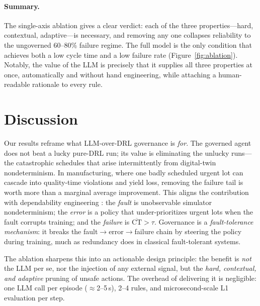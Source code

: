 \documentclass[letterpaper]{article} %
\begin{document}
\paragraph{Summary.}
The single-axis ablation gives a clear verdict: each of the three
properties---hard, contextual, adaptive---is necessary, and removing any one
collapses reliability to the ungoverned 60--80\% failure regime. The full model
is the only condition that achieves both a low cycle time and a low failure rate
(Figure~\ref{fig:ablation}). Notably, the value of the LLM is precisely that it
supplies all three properties at once, automatically and without hand
engineering, while attaching a human-readable rationale to every rule.

\section{Discussion}
\label{sec:discussion}

Our results reframe what LLM-over-DRL governance is \emph{for}. The governed
agent does not beat a lucky pure-DRL run; its value is eliminating the unlucky
runs---the catastrophic schedules that arise intermittently from digital-twin
nondeterminism. In manufacturing, where one badly scheduled urgent lot can
cascade into quality-time violations and yield loss, removing the failure tail is
worth more than a marginal average improvement. This aligns the contribution with
dependability engineering \citep{avizienis2004}: the \emph{fault} is
unobservable simulator nondeterminism; the \emph{error} is a policy that
under-prioritizes urgent lots when the fault corrupts training; and the
\emph{failure} is $\overline{\mathrm{CT}}>\tau$. Governance is a
\emph{fault-tolerance mechanism}: it breaks the fault$\to$error$\to$failure chain
by steering the policy during training, much as redundancy does in classical
fault-tolerant systems.

The ablation sharpens this into an actionable design principle: the benefit is
\emph{not} the LLM per se, nor the injection of any external signal, but the
\emph{hard, contextual, and adaptive} pruning of unsafe actions. The overhead of
delivering it is negligible: one LLM call per episode ($\approx$2--5\,s), 2--4
rules, and microsecond-scale L1 evaluation per step.
\end{document}
